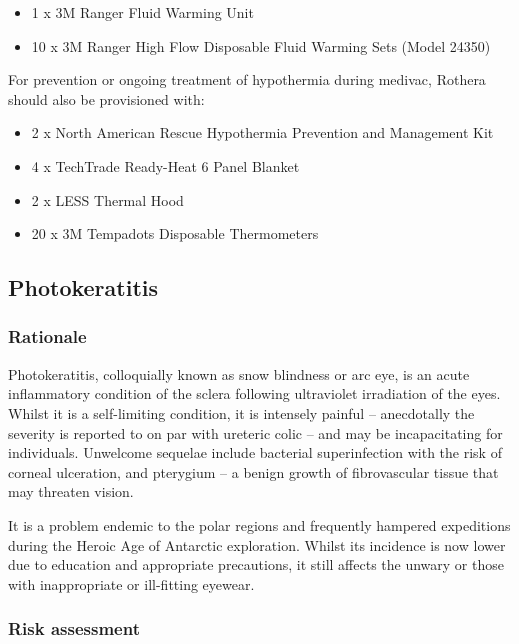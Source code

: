 \documentclass[12pt,a4paper]{article}
\newenvironment{boldenumerate}
    {\begin{enumerate}\renewcommand\labelenumi{\textbf\theenumi}}
    {\end{enumerate}}
\begin{document}
\begin{boldenumerate}
\begin{itemize}
        \item 1 x 3M Ranger Fluid Warming Unit
        \item 10 x 3M Ranger High Flow Disposable Fluid Warming Sets (Model 24350)
    \end{itemize}
    For prevention or ongoing treatment of hypothermia during medivac, Rothera should also be provisioned with:
    \begin{itemize}
        \item 2 x North American Rescue Hypothermia Prevention and Management Kit
        \item 4 x TechTrade Ready-Heat 6 Panel Blanket
        \item 2 x LESS Thermal Hood
        \item 20 x 3M Tempadots Disposable Thermometers
    \end{itemize}
\end{boldenumerate}

\subsection{Photokeratitis}

\subsubsection{Rationale}

Photokeratitis, colloquially known as snow blindness or arc eye, is an acute inflammatory condition of the sclera following ultraviolet irradiation of the eyes. Whilst it is a self-limiting condition, it is intensely painful -- anecdotally the severity is reported to on par with ureteric colic -- and may be incapacitating for individuals. Unwelcome sequelae include bacterial superinfection with the risk of corneal ulceration, and pterygium -- a benign growth of fibrovascular tissue that may threaten vision.

It is a problem endemic to the polar regions and frequently hampered expeditions during the Heroic Age of Antarctic exploration.\cite{Guly:2012kl} Whilst its incidence is now lower due to education and appropriate precautions, it still affects the unwary or those with inappropriate or ill-fitting eyewear.\cite{BritishAntarcticSurveyMedicalUnit:2013vj}

\subsubsection{Risk assessment}
\end{document}

